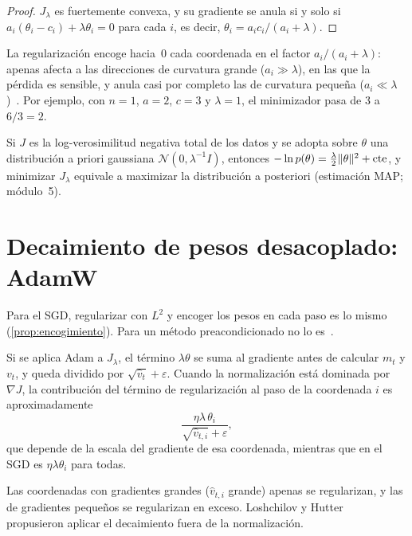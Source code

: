 \begin{proof}
$J_\lambda$ es fuertemente convexa, y su gradiente se anula si y solo si $a_i(\theta_i-c_i)+\lambda\theta_i=0$ para cada $i$, es decir, $\theta_i=a_ic_i/(a_i+\lambda)$.
\end{proof}

La regularización encoge hacia~0 cada coordenada en el factor $a_i/(a_i+\lambda)$: apenas afecta a las direcciones de curvatura grande ($a_i\gg\lambda$), en las que la pérdida es sensible, y anula casi por completo las de curvatura pequeña ($a_i\ll\lambda$)~\cite[§7.1.1]{gbc}. Por ejemplo, con $n=1$, $a=2$, $c=3$ y $\lambda=1$, el minimizador pasa de $3$ a $6/3=2$.

\begin{observacion}
Si $J$ es la log-verosimilitud negativa total de los datos y se adopta sobre $\theta$ una distribución a priori gaussiana $\mathcal{N}(0,\lambda^{-1}I)$, entonces $-\ln p(\theta)=\frac{\lambda}{2}\lVert\theta\rVert^{2}+\text{cte}$, y minimizar $J_\lambda$ equivale a maximizar la distribución a posteriori (estimación MAP; módulo~5).
\end{observacion}

\section{Decaimiento de pesos desacoplado: AdamW}

Para el SGD, regularizar con $L^{2}$ y encoger los pesos en cada paso es lo mismo (\cref{prop:encogimiento}). Para un método preacondicionado no lo es~\cite[§2]{adamw}.

\begin{observacion}\label{obs:adam-l2}
Si se aplica Adam a $J_\lambda$, el término $\lambda\theta$ se suma al gradiente antes de calcular $m_t$ y $v_t$, y queda dividido por $\sqrt{\hat v_t}+\varepsilon$. Cuando la normalización está dominada por $\nabla J$, la contribución del término de regularización al paso de la coordenada $i$ es aproximadamente
\[
\frac{\eta\lambda\,\theta_i}{\sqrt{\hat v_{t,i}}+\varepsilon},
\]
que depende de la escala del gradiente de esa coordenada, mientras que en el SGD es $\eta\lambda\theta_i$ para todas.
\end{observacion}

Las coordenadas con gradientes grandes ($\hat v_{t,i}$ grande) apenas se regularizan, y las de gradientes pequeños se regularizan en exceso. Loshchilov y Hutter~\cite{adamw} propusieron aplicar el decaimiento fuera de la normalización.

